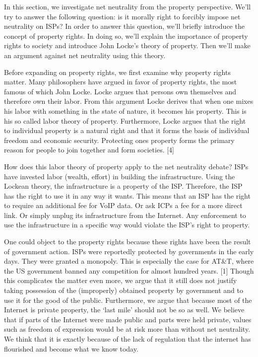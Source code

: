 
In this section, we investigate net neutrality from the property perspective. We'll try to answer the following question: is it morally right to forcibly impose net neutrality on \acp{ISP}? In order to answer this question, we'll briefly introduce the concept of property rights. In doing so, we'll explain the importance of property rights to society and introduce John Locke's theory of property. Then we'll make an argument against net neutrality using this theory.

Before expanding on property rights, we first examine why property rights matter. Many philosophers have argued in favor of property rights, the most famous of which John Locke. Locke argues that persons own themselves and therefore own their labor. From this argument Locke derives that when one mixes his labor with something in the state of nature, it becomes his property. This is his so called labor theory of property. Furthermore, Locke argues that the right to individual property is a natural right and that it forms the basis of individual freedom and economic security. Protecting ones property forms the primary reason for people to join together and form societies. [4]

How does this labor theory of property apply to the net neutrality debate? \acp{ISP} have invested labor (wealth, effort) in building the infrastructure. Using the Lockean theory, the infrastructure is a property of the \ac{ISP}. Therefore, the \ac{ISP} has the right to use it in any way it wants. This means that an \ac{ISP} has the right to require an additional fee for \ac{VoIP} data. Or ask ICPs a fee for a more direct link. Or simply unplug its infrastructure from the Internet. Any enforcement to use the infrastructure in a specific way would violate the \ac{ISP}'s right to property.

One could object to the property rights because these rights have been the result of government action. \acp{ISP} were reportedly protected by governments in the early days. They were granted a monopoly. This is especially the case for AT\&T, where the US government banned any competition for almost hundred years. [1] Though this complicates the matter even more, we argue that it still does not justify taking possession of the (improperly) obtained property by government and to use it for the good of the public. Furthermore, we argue that because most of the Internet is private property, the `last mile' should not be so as well. We believe that if parts of the Internet were made public and parts were held private, values such as freedom of expression would be at risk more than without net neutrality. We think that it is exactly because of the lack of regulation that the internet has flourished and become what we know today.

